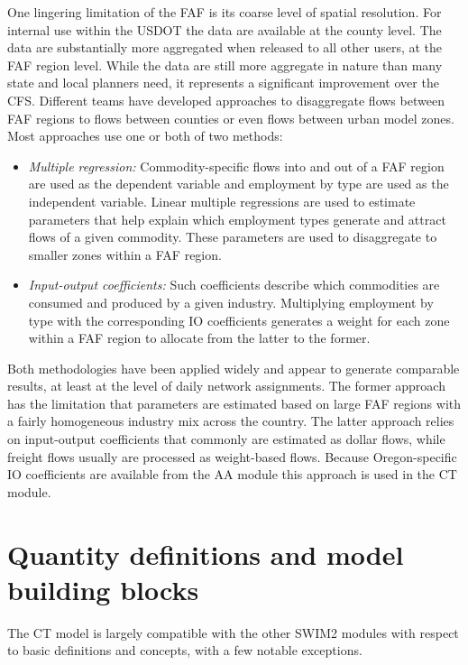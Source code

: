 One lingering limitation of the FAF is its coarse level of spatial resolution. For internal use within the USDOT the data are available at the county level. The data are substantially more aggregated when released to all other users, at the FAF region level. While the data are still more aggregate in nature than many state and local planners need, it represents a significant improvement over the CFS. Different teams have developed approaches to disaggregate flows between FAF regions to flows between counties or even flows between urban model zones. Most approaches use one or both of two methods:
\begin{itemize}
\item \textit{Multiple regression:} Commodity-specific flows into and out of a FAF region are used as the dependent variable and employment by type are used as the independent variable. Linear multiple regressions are used to estimate parameters that help explain which employment types generate and attract flows of a given commodity. These parameters are used to disaggregate to smaller zones within a FAF region. 
\item \textit{Input-output coefficients:} Such coefficients describe which commodities are consumed and produced by a given industry. Multiplying employment by type with the corresponding IO coefficients generates a weight for each zone within a FAF region to allocate from the latter to the former.
\end{itemize}

\noindent Both methodologies have been applied widely and appear to generate comparable results, at least at the level of daily network assignments. The former approach has the limitation that parameters are estimated based on large FAF regions with a fairly homogeneous industry mix across the country. The latter approach relies on input-output coefficients that commonly are estimated as dollar flows, while freight flows usually are processed as weight-based flows. Because Oregon-specific IO coefficients are available from the AA module this approach is used in the CT module.

\section{Quantity definitions and model building blocks}

The CT model is largely compatible with the other SWIM2 modules with respect to basic definitions and concepts, with a few notable exceptions.

